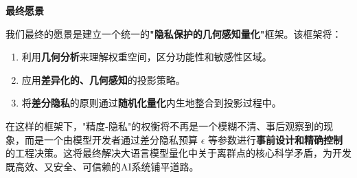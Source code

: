 \documentclass[letterpaper,twocolumn,10pt]{article}
\begin{document}
\textbf{最终愿景}

我们最终的愿景是建立一个统一的\textbf{"隐私保护的几何感知量化"}框架。该框架将：

\begin{enumerate}
\item 利用\textbf{几何分析}来理解权重空间，区分功能性和敏感性区域。
\item 应用\textbf{差异化的、几何感知}的投影策略。
\item 将\textbf{差分隐私}的原则通过\textbf{随机化量化}内生地整合到投影过程中。
\end{enumerate}

在这样的框架下，"精度-隐私"的权衡将不再是一个模糊不清、事后观察到的现象，而是一个由模型开发者通过差分隐私预算 $\epsilon$ 等参数进行\textbf{事前设计和精确控制}的工程决策。这将最终解决大语言模型量化中关于离群点的核心科学矛盾，为开发既高效、又安全、可信赖的AI系统铺平道路。

% 
% 
\end{document}

